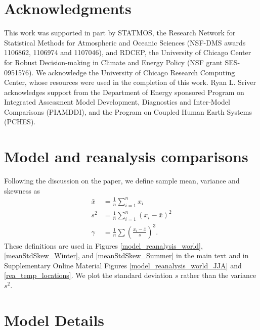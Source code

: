 \documentclass{ametsoc}
\begin{document}
\section*{Acknowledgments}
This work was supported in part by STATMOS, the Research Network for Statistical Methods for
Atmospheric and Oceanic Sciences (NSF-DMS awards 1106862,
1106974 and 1107046), and RDCEP, the University of Chicago
Center for Robust Decision-making in Climate and Energy Policy
(NSF grant SES-0951576). We acknowledge the University of Chicago
Research  Computing  Center,  whose  resources  were  used  in  the
completion of this work. Ryan L. Sriver acknowledges support from the Department of Energy sponsored Program on Integrated Assessment Model Development, Diagnostics and Inter-Model Comparisons (PIAMDDI), and the Program on Coupled Human Earth Systems (PCHES).

\newpage
\appendix

\section{Model and reanalysis comparisons}
\label{app:moments}

Following the discussion on the paper, we define sample mean, variance and skewness as
\begin{align}
\bar{x} &= \frac{1}{n}\sum_{i=1}^n x_i \nonumber\\ 
s^2 &= \frac{1}{n}\sum_{i=1}^n \left(x_i - \bar{x}\right)^2 \nonumber\\ 
\gamma &= \frac{1}{n}\sum \left(\frac{x_i - \bar{x}}{s}\right)^3.
\end{align}
These definitions are used in Figures \ref{model_reanalysis_world}, \ref{meanStdSkew_Winter}, and \ref{meanStdSkew_Summer} in the main text  
and in Supplementary Online Material Figures \ref{model_reanalysis_world_JJA} and \ref{rea_temp_locations}. We plot the standard deviation ${s}$ rather than the variance $s^2$. %



\section{Model Details}
\label{app:model}
\end{document}
